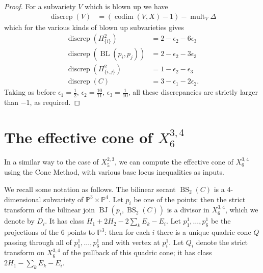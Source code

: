 \documentclass[a4paper,11pt]{article}
\newcommand{\PP}{\mathbb P}
\newcommand{\discrep}{\operatorname{discrep}}
\newcommand{\BL}{\operatorname{BL}}
\newcommand{\BJ}{\operatorname{BJ}}
\newcommand{\BS}{\operatorname{BS}}
\begin{document}
\begin{proof}
For a subvariety $V$ which is blown up we have
\begin{align*}
\discrep(V) &= \left(\operatorname{codim}(V,X) -1 \right) - \operatorname{mult}_V\Delta
\end{align*}
which for the various kinds of blown up subvarieties gives
\begin{align*}
    \discrep(\Pi^2_{\{i\}}) &= 2-\epsilon_2-6\epsilon_3 \\
    \discrep(\BL(p_i,p_j)) &= 2 - \epsilon_2- 3\epsilon_3\\ 
    \discrep(\Pi^2_{\{i,j\}}) &= 1-\epsilon_2-\epsilon_3\\
    \discrep(C) &=3-\epsilon_1-2\epsilon_2. 
\end{align*}
Taking as before $\epsilon_1 = \frac12, \, \epsilon_2 = \frac{10}{11}, \, \epsilon_3 = \frac{1}{10}$, all these discrepancies are strictly larger than $-1$, as required. 
\end{proof}

\section{The effective cone of \texorpdfstring{$X^{3,4}_6$}{X{3,4}6}}\label{section-X346}

In a similar way to the case of $X^{2,3}_5$, we can compute the effective cone of $X^{3,4}_6$ using the Cone Method, with various base locus inequalities as inputs. 

We recall some notation as follows. The bilinear secant $\BS_2(C)$ is a 4-dimensional subvariety of $\PP^3 \times \PP^4$. Let $p_i$ be one of the points: then the strict transform of the bilinear join $\BJ(p_i,\BS_2(C))$ is a divisor in $X^{3,4}_6$, which we denote by $D_i$. It has class $H_1+2H_2-2\sum_k E_k -E_i$. Let $p^1_1,\ldots,p^1_6$ be the projections of the 6 points to $\PP^3$: then for each $i$ there is a unique quadric cone $Q$ passing through all of $p^1_1,\ldots,p^1_6$ and with vertex at $p^1_i$. Let $Q_i$ denote the strict transform on $X^{3,4}_6$ of the pullback of this quadric cone; it has class $2H_1-\sum_kE_k-E_i$.
\end{document}

